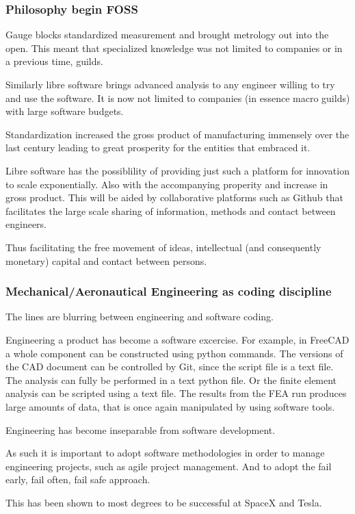 \documentclass{beamer}
\begin{document}
\begin{frame}
\frametitle{Philosophy begin FOSS}

Gauge blocks standardized measurement and brought metrology out into the open.  This meant that specialized knowledge was not limited to companies or in a previous time, guilds.

Similarly libre software brings advanced analysis to any engineer willing to try and use the software.  It is now not limited to companies (in essence macro guilds) with large software budgets.

Standardization increased the gross product of manufacturing immensely over the last century leading to great prosperity for the entities that embraced it.

Libre software has the possiblility of providing just such a platform for innovation to scale exponentially.  Also with the accompanying properity and increase in gross product.
This will be aided by collaborative platforms such as Github that facilitates the large scale sharing of information, methods and contact between engineers.

Thus facilitating the free movement of ideas, intellectual (and consequently monetary) capital and contact between persons.

\end{frame}




\begin{frame}
\frametitle{Mechanical/Aeronautical Engineering as coding discipline}

The lines are blurring between engineering and software coding.

Engineering a product has become a software excercise.  For example, in FreeCAD a whole component can be constructed using python commands.  The versions of the CAD document can be controlled by Git, since the script file is a text file.
The analysis can fully be performed in a text python file.  Or the finite element analysis can be scripted using a text file.
The results from the FEA run produces large amounts of data, that is once again manipulated by using software tools.

Engineering has become inseparable from software development.

As such it is important to adopt software methodologies in order to manage engineering projects, such as agile project management.  And to adopt the fail early, fail often, fail safe approach.

This has been shown to most degrees to be successful at SpaceX and Tesla.


\end{frame}
\end{document}
